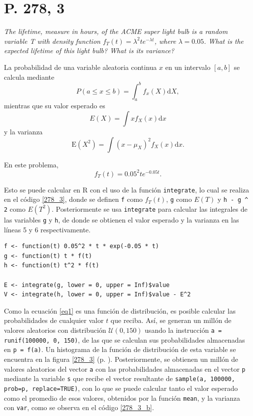 \documentclass[paper=leter, fontsize=11pt]{scrartcl}
\begin{document}
\section*{P. 278, 3}
\emph{The lifetime, measure in hours, of the ACME super light bulb is a random variable T with density function \(f_T (t) = \lambda^2 te^{- \lambda t}\), where \(\lambda = 0.05\). What is the expected lifetime of this light bulb? What is its variance?}

La probabilidad de una variable aleatoria continua $x$ en un intervalo $[a, b]$ se calcula mediante
\begin{dmath*}
    P(a \leq x \leq b) = \int_a^b f_x(X) \mathrm{d}X,
\end{dmath*}
mientras que su valor esperado es
\begin{dmath*}
    E(X) = \int x f_X(x) \mathrm{d}x
\end{dmath*}
y la varianza
\begin{dmath*}
    \text{E}(X^2) = \int (x - \mu_X)^2 f_X(x) \mathrm{d}x.
\end{dmath*}

En este problema,  
\begin{dmath}
    \label{eq1}
    f_T (t) = 0.05^2 te^{- 0.05 t}.
\end{dmath}

Esto se puede calcular en R con el uso de la función \texttt{integrate}, lo cual se realiza en el código \ref{278_3}, donde se definen \texttt{f} como $f_T(t)$, \texttt{g} como $E(T)$ y \texttt{h - g ^ 2} como $E(T^2)$. Posteriormente se usa \texttt{integrate} para calcular las integrales de las variables \texttt{g} y \texttt{h}, de donde se obtienen el valor esperado y la varianza en las líneas 5 y 6 respectivamente.

\begin{lstlisting}[caption={P. 278, 3; solución analítica}, captionpos=t, label=278_3]
f <- function(t) 0.05^2 * t * exp(-0.05 * t)
g <- function(t) t * f(t)
h <- function(t) t^2 * f(t)

E <- integrate(g, lower = 0, upper = Inf)$value
V <- integrate(h, lower = 0, upper = Inf)$value - E^2
\end{lstlisting}

Como la ecuación \ref{eq1} es una función de distribución, es posible calcular las probabilidades de cualquier valor $t$ que reciba. Así, se generan un millón de valores aleatorios con distribución $\mathcal{U}(0, 150)$ usando la instrucción \texttt{a = runif(100000, 0, 150)}, de las que se calculan sus probabilidades almacenadas en \texttt{p = f(a)}. Un histograma de la función de distribución de esta variable se encuentra en la figura \ref{278_3} (p. \pageref{278_3}). Posteriormente, se obtienen un millón de valores aleatorios del vector \texttt{a} con las probabilidades almacenadas en el vector \texttt{p} mediante la variable \texttt{s} que recibe el vector resultante de \texttt{sample(a, 100000, prob=p, replace=TRUE)}, con lo que se puede calcular tanto el valor esperado como el promedio de esos valores, obtenidos por la función \texttt{mean}, y la varianza con \texttt{var}, como se observa en el código \ref{278_3_b}.
\end{document}
